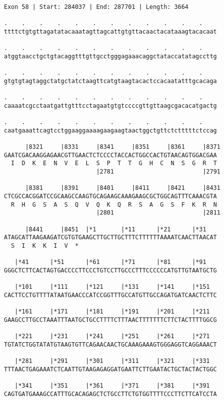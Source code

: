 \documentclass{article}
\begin{document}
\newpage
\begin{Verbatim}
Exon 58 | Start: 284037 | End: 287701 | Length: 3664
 
.    .    .    .    .    .    .    .    .    .    .    .    
ttttctgtgttagatatacaaatagttagcattgtgttacaactacataaagtacacaat
  
.    .    .    .    .    .    .    .    .    .    .    .    
atggtaacctgctgtacaggtttgttgcctgggagaaacaggctataccatatagccttg
  
.    .    .    .    .    .    .    .    .    .    .    .    
gtgtgtagtaggctatgctatctaagttcatgtaagtacactccacaatatttgcacaga
  
.    .    .    .    .    .    .    .    .    .    .    .    
caaaatcgcctaatgattgtttcctagaatgtgtccccgttgttaagcgacacatgactg
  
.    .    .    .    .    .    .    .    .    .    .    .    
caatgaaattcagtcctggaaggaaaagaagaagtaactggctgttctctttttctccag
  
      |8321     |8331     |8341     |8351     |8361     |8371
GAATCGACAAGGAGAACGTTGAACTCTCCCCTACCACTGGCCACTGTAACAGTGGACGAA
  I  D  K  E  N  V  E  L  S  P  T  T  G  H  C  N  S  G  R  T
                          |2781                         |2791
  
      |8381     |8391     |8401     |8411     |8421     |8431
CTCGCCACGGATCCGCAAGCCAAGTGCAGAAGCAAAGAAGCGCTGGCAGTTTCAAACGTA
  R  H  G  S  A  S  Q  V  Q  K  Q  R  S  A  G  S  F  K  R  N
                          |2801                         |2811
  
      |8441     |8451  |*1       |*11      |*21      |*31   
ATAGCATTAAGAAGATCGTGTGAAGCTTGCTTGCTTTCTTTTTTAAAATCAACTTAACAT
  S  I  K  K  I  V  *   
  
   |*41      |*51      |*61      |*71      |*81      |*91   
GGGCTCTTCACTAGTGACCCCTTCCCTGTCCTTGCCCTTTCCCCCCATGTTGTAATGCTG
  
   |*101     |*111     |*121     |*131     |*141     |*151  
CACTTCCTGTTTTATAATGAACCCATCCGGTTTGCCATGTTGCCAGATGATCAACTCTTC
  
   |*161     |*171     |*181     |*191     |*201     |*211  
GAAGCCTTGCCTAAATTTAATGCTGCCTTTTCTTTAACTTTTTTTCTTCTACTTTTGGCG
  
   |*221     |*231     |*241     |*251     |*261     |*271  
TGTATCTGGTATATGTAAGTGTTCAGAACAACTGCAAAGAAAGTGGGAGGTCAGGAAACT
  
   |*281     |*291     |*301     |*311     |*321     |*331  
TTTAACTGAGAAATCTCAATTGTAAGAGAGGATGAATTCTTGAATACTGCTACTACTGGC
  
   |*341     |*351     |*361     |*371     |*381     |*391  
CAGTGATGAAAGCCATTTGCACAGAGCTCTGCCTTCTGTGGTTTTCCCTTCTTCATCCTA
  

\end{Verbatim}
\end{document}
